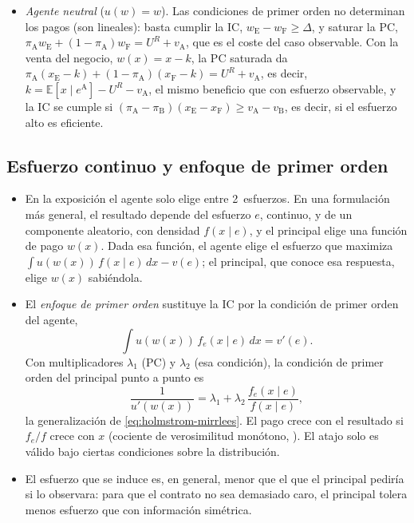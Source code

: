 \documentclass[11pt]{article}
\begin{document}
\begin{itemize}
  que es \eqref{eq:coste-agencia}: el principal paga de media más que con esfuerzo observable, y la diferencia es la prima de riesgo que exige el agente.
\item \emph{Agente neutral} ($u(w)=w$). Las condiciones de primer orden no determinan los pagos (son lineales): basta cumplir la IC, $w_{\mathrm{E}}-w_{\mathrm{F}}\geq\Delta$, y saturar la PC, $\pi_{\mathrm{A}}w_{\mathrm{E}}+(1-\pi_{\mathrm{A}})w_{\mathrm{F}}=U^R+v_{\mathrm{A}}$, que es el coste del caso observable. Con la venta del negocio, $w(x)=x-k$, la PC saturada da $\pi_{\mathrm{A}}(x_{\mathrm{E}}-k)+(1-\pi_{\mathrm{A}})(x_{\mathrm{F}}-k)=U^R+v_{\mathrm{A}}$, es decir, $k=\mathbb{E}[x\mid e^{\mathrm{A}}]-U^R-v_{\mathrm{A}}$, el mismo beneficio que con esfuerzo observable, y la IC se cumple si $(\pi_{\mathrm{A}}-\pi_{\mathrm{B}})(x_{\mathrm{E}}-x_{\mathrm{F}})\geq v_{\mathrm{A}}-v_{\mathrm{B}}$, es decir, si el esfuerzo alto es eficiente.
\end{itemize}
\findemo

\subsection{Esfuerzo continuo y enfoque de primer orden}\label{anexo:pa-continuo}

\begin{itemize}
\item En la exposición el agente solo elige entre 2~esfuerzos. En una formulación más general, el resultado depende del esfuerzo $e$, continuo, y de un componente aleatorio, con densidad $f(x\mid e)$, y el principal elige una función de pago $w(x)$. Dada esa función, el agente elige el esfuerzo que maximiza $\int u(w(x))\,f(x\mid e)\,dx-v(e)$; el principal, que conoce esa respuesta, elige $w(x)$ sabiéndola.
\item El \emph{enfoque de primer orden} sustituye la IC por la condición de primer orden del agente,
  \begin{equation}
  \int u(w(x))\,f_e(x\mid e)\,dx=v'(e).
  \end{equation}
  Con multiplicadores $\lambda_1$ (PC) y $\lambda_2$ (esa condición), la condición de primer orden del principal punto a punto es
  \begin{equation}
  \frac{1}{u'(w(x))}=\lambda_1+\lambda_2\,\frac{f_e(x\mid e)}{f(x\mid e)},
  \end{equation}
  la generalización de \eqref{eq:holmstrom-mirrlees}\nocite{Holmstrom1979Moral}. El pago crece con el resultado si $f_e/f$ crece con $x$ (cociente de verosimilitud monótono, \textcite{Milgrom1981Good}). El atajo solo es válido bajo ciertas condiciones sobre la distribución\nocite{GrossmanHart1983Analysis,Rogerson1985FirstOrder}.
\item El esfuerzo que se induce es, en general, menor que el que el principal pediría si lo observara: para que el contrato no sea demasiado caro, el principal tolera menos esfuerzo que con información simétrica.
\end{itemize}
\end{document}
